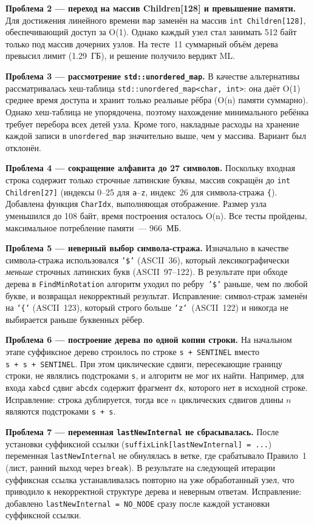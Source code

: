 \documentclass[12pt]{article}
\begin{document}
\textbf{Проблема 2 — переход на массив Children[128] и превышение памяти.}
Для достижения линейного времени \texttt{map} заменён на массив
\texttt{int Children[128]}, обеспечивающий доступ за O(1).
Однако каждый узел стал занимать 512 байт только под массив
дочерних узлов. На тесте~11 суммарный объём дерева превысил
лимит (1.29~ГБ), и решение получило вердикт ML.

\textbf{Проблема 3 — рассмотрение \texttt{std::unordered\_map}.}
В качестве альтернативы рассматривалась хеш-таблица
\texttt{std::unordered\_map<char,~int>}: она даёт O(1) среднее
время доступа и хранит только реальные рёбра (O(n) памяти суммарно).
Однако хеш-таблица не упорядочена, поэтому нахождение минимального
ребёнка требует перебора всех детей узла. Кроме того, накладные
расходы на хранение каждой записи в \texttt{unordered\_map}
значительно выше, чем у массива. Вариант был отклонён.

\textbf{Проблема 4 — сокращение алфавита до 27 символов.}
Поскольку входная строка содержит только строчные латинские буквы,
массив сокращён до \texttt{int Children[27]} (индексы 0--25 для
\texttt{a}--\texttt{z}, индекс~26 для символа-стража \texttt{\{}).
Добавлена функция \texttt{CharIdx}, выполняющая отображение.
Размер узла уменьшился до 108 байт, время построения осталось
O(n). Все тесты пройдены, максимальное потребление памяти~--- 966~МБ.

\textbf{Проблема 5 — неверный выбор символа-стража.}
Изначально в качестве символа-стража использовался \texttt{'\$'}
(ASCII~36), который лексикографически \textit{меньше} строчных
латинских букв (ASCII~97--122). В результате при обходе дерева
в \texttt{FindMinRotation} алгоритм уходил по ребру~\texttt{'\$'}
раньше, чем по любой букве, и возвращал некорректный результат.
Исправление: символ-страж заменён на \texttt{'\{'} (ASCII~123),
который строго больше \texttt{'z'}~(ASCII~122) и никогда не
выбирается раньше буквенных рёбер.

\textbf{Проблема 6 — построение дерева по одной копии строки.}
На начальном этапе суффиксное дерево строилось по строке
\texttt{s + SENTINEL} вместо \texttt{s~+~s~+~SENTINEL}.
При этом циклические сдвиги, пересекающие границу строки,
не являлись подстроками \texttt{s}, и алгоритм не мог их найти.
Например, для входа \texttt{xabcd} сдвиг \texttt{abcdx}
содержит фрагмент \texttt{dx}, которого нет в исходной строке.
Исправление: строка дублируется, тогда все $n$ циклических
сдвигов длины $n$ являются подстроками \texttt{s~+~s}.

\textbf{Проблема 7 — переменная \texttt{lastNewInternal} не сбрасывалась.}
После установки суффиксной ссылки (\texttt{suffixLink[lastNewInternal]~=~...})
переменная \texttt{lastNewInternal} не обнулялась в ветке,
где срабатывало Правило~1 (лист, ранний выход через \texttt{break}).
В результате на следующей итерации суффиксная ссылка
устанавливалась повторно на уже обработанный узел, что приводило
к некорректной структуре дерева и неверным ответам.
Исправление: добавлено \texttt{lastNewInternal~=~NO\_NODE}
сразу после каждой установки суффиксной ссылки.
\end{document}
